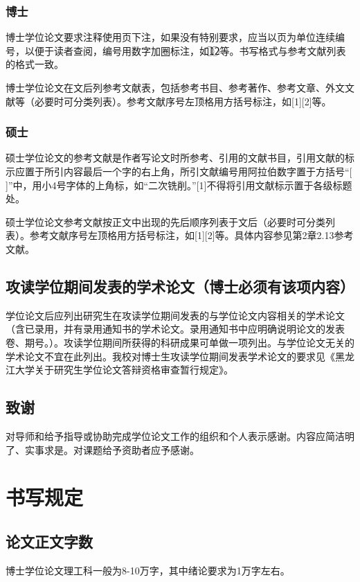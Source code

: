 \subsubsection{博士}
博士学位论文要求注释使用页下注，如果没有特别要求，应当以页为单位连续编号，以便于读者查阅，编号用数字加圈标注，如\textcircled{1}\textcircled{2}等。书写格式与参考文献列表的格式一致。

博士学位论文在文后列参考文献表，包括参考书目、参考著作、参考文章、外文文献等（必要时可分类列表）。参考文献序号左顶格用方括号标注，如[1][2]等。
\subsubsection{硕士}

硕士学位论文的参考文献是作者写论文时所参考、引用的文献书目，引用文献的标示应置于所引内容最后一个字的右上角，所引文献编号用阿拉伯数字置于方括号“[ ]”中，用小4号字体的上角标，如“二次铣削。”[1]不得将引用文献标示置于各级标题处。

硕士学位论文参考文献按正文中出现的先后顺序列表于文后（必要时可分类列表）。参考文献序号左顶格用方括号标注，如[1][2]等。具体内容参见第2章2.13参考文献。

\subsection{攻读学位期间发表的学术论文（博士必须有该项内容）}
学位论文后应列出研究生在攻读学位期间发表的与学位论文内容相关的学术论文（含已录用，并有录用通知书的学术论文。录用通知书中应明确说明论文的发表卷、期号。）。攻读学位期间所获得的科研成果可单做一项列出。与学位论文无关的学术论文不宜在此列出。我校对博士生攻读学位期间发表学术论文的要求见《黑龙江大学关于研究生学位论文答辩资格审查暂行规定》。
\subsection{致谢}
对导师和给予指导或协助完成学位论文工作的组织和个人表示感谢。内容应简洁明了、实事求是。对课题给予资助者应予感谢。
\pagebreak

\section{书写规定}
\subsection{论文正文字数}

博士学位论文理工科一般为8-10万字，其中绪论要求为1万字左右。

